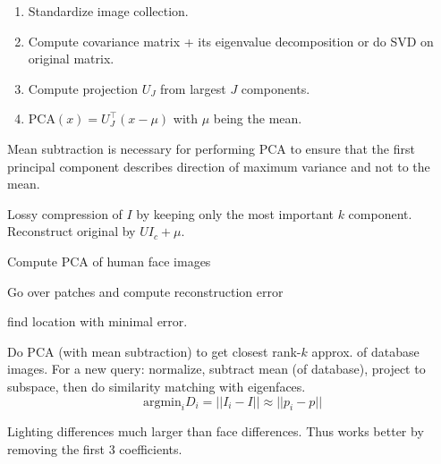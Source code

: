 \begin{definition}
  \begin{enumerate}
    \item Standardize image collection.
    \item Compute covariance matrix + its eigenvalue decomposition or do SVD on original matrix.
    \item Compute projection \(U_J\) from largest \(J\) components.
    \item \(\text{PCA}(x) = U_J^\top(x - \mu)\) with \(\mu\) being the mean.
  \end{enumerate}
\end{definition}

\begin{theorem}
  Mean subtraction is necessary for performing PCA to ensure that the first principal component describes direction of maximum variance and not to the mean.
\end{theorem}

\begin{definition}
  Lossy compression of \(I\) by keeping only the most important \(k\) component. Reconstruct original by \(UI_c + \mu\).
\end{definition}

\begin{definition}
  \begin{itemize*}
    \item Compute PCA of human face images
    \item Go over patches and compute reconstruction error
    \item find location with minimal error.
  \end{itemize*}
\end{definition}

\begin{algorithm}
  Do PCA (with mean subtraction) to get closest rank-\(k\) approx. of database images. For a new query: normalize, subtract mean (of database), project to subspace, then do similarity matching with eigenfaces.
  \[\text{argmin}_i D_i = ||I_i - I|| \approx ||p_i - p||\]
\end{algorithm}

\begin{theorem}
  Lighting differences much larger than face differences. Thus works better by removing the first 3 coefficients.
\end{theorem}


